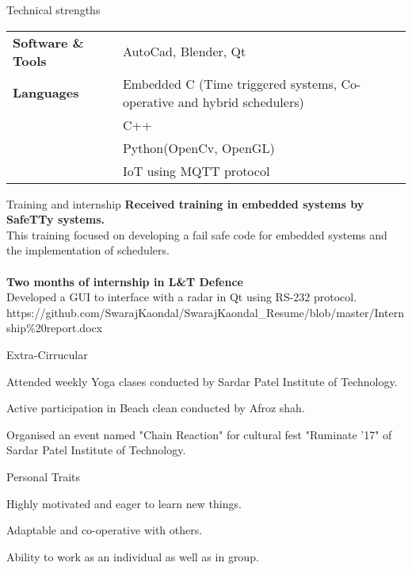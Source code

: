\documentclass{resume} %
\begin{document}
\begin{rSection}{Technical strengths}
\begin{tabular}{ @{} >{\bfseries}l @{\hspace{6ex}} l }
Software \& Tools \ & AutoCad, Blender, Qt \\
Languages & Embedded C (Time triggered systems, Co-operative and hybrid schedulers)\\ & C++\\ & Python(OpenCv, OpenGL) \\ & IoT using MQTT protocol \\
\end{tabular}
\end{rSection}

\begin{rSection}{Training and internship}
{\bf Received training in embedded systems by SafeTTy systems.}
\\This training focused on developing a fail safe code for embedded systems and the implementation of schedulers.\\
\\{\bf Two months of internship in L\&T Defence}
\\Developed a GUI to interface with a radar in Qt using RS-232 protocol.
\\https://github.com/SwarajKaondal/SwarajKaondal\_Resume/blob/master/Internship\%20report.docx
\end{rSection}

\newpage
\begin{rSection}{Extra-Cirrucular} \itemsep -3pt
\item Attended weekly Yoga clases conducted by Sardar Patel Institute of Technology.
\item Active participation in Beach clean conducted by Afroz shah.
\item Organised an event named "Chain Reaction" for cultural fest "Ruminate '17" of Sardar Patel Institute of Technology.
\end{rSection}

\begin{rSection}{Personal Traits}
\item Highly motivated and eager to learn new things.
\item Adaptable and co-operative with others.
\item Ability to work as an individual as well as in group.
\end{rSection}
\end{document}
